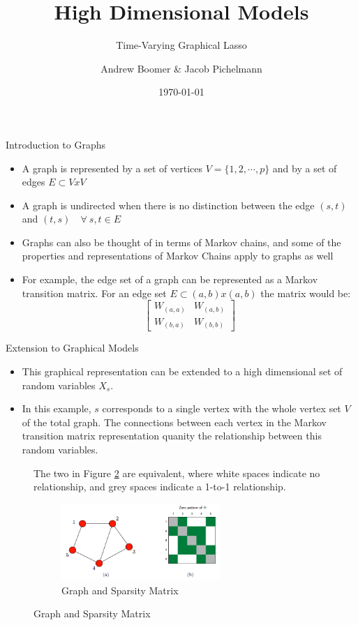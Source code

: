 \documentclass{beamer}
\title[High Dimensional Models] %
{High Dimensional Models}
\subtitle{Time-Varying Graphical Lasso}
\author[Andrew Boomer \& Jacob Pichelmann] %
{Andrew Boomer \& Jacob Pichelmann}
\institute []
{Toulouse School of Economics \\ M2 EEE}
\date{\today}
\begin{document}
\frame{\titlepage}
    
\begin{frame}{Introduction to Graphs}
    \begin{itemize}
        \item A graph is represented by a set of vertices $V = \{1, 2, \dotsb, p\}$ and by a set of edges $E \subset V x V$
        \item A graph is undirected when there is no distinction between the edge $(s, t)$ and $(t, s) \quad \forall \ s, t \in E$
        \item Graphs can also be thought of in terms of Markov chains, and some of the properties and representations of Markov Chains apply to graphs as well
        \item For example, the edge set of a graph can be represented as a Markov transition matrix. For an edge set $E \subset (a, b) x (a, b)$ the matrix would be:
        \[\begin{bmatrix} W_{(a, a)} & W_{(a, b)} \\
           W_{(b, a)} & W_{(b, b)} \end{bmatrix}\]
    \end{itemize}
\end{frame}

\begin{frame}{Extension to Graphical Models}
  \begin{itemize}
    \item This graphical representation can be extended to a high dimensional set of random variables $X_{s}$.
    \item In this example, $s$ corresponds to a single vertex with the whole vertex set $V$ of the total graph. The connections between each vertex in the Markov transition matrix representation quanity the relationship between this random variables.
  \end{itemize}
  \begin{figure}
  \begin{minipage}{0.4\textwidth}
      The two in Figure \ref{fig:IntroPic} are equivalent, where white spaces indicate no relationship, and grey spaces indicate a 1-to-1 relationship.
  \end{minipage}%
  \begin{minipage}{0.6\textwidth}
    \begin{figure}
       \includegraphics[width=6cm]{IntroGraphMat.png}
       \caption{Graph and Sparsity Matrix}
       \label{fig:IntroPic}
  \end{figure} 
  \end{minipage}
  \end{figure}
\end{frame}
\end{document}
